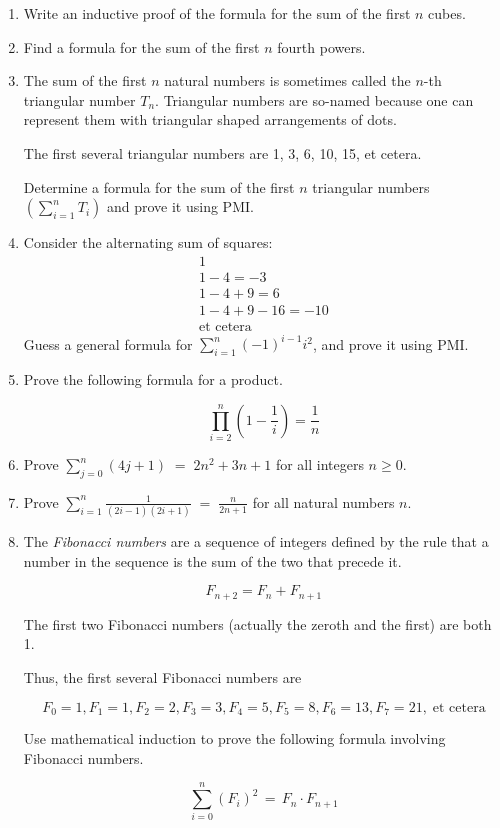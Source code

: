 \begin{enumerate}
\item Write an inductive proof of the formula for the sum 
of the first $n$ cubes.

\item Find a formula for the sum of the first $n$ fourth powers.

\item The sum of the first $n$ natural numbers is sometimes called
the $n$-th triangular number $T_n$.  Triangular numbers are so-named
because one can represent them with triangular shaped arrangements 
of dots. 

\begin{center}  \end{center}

The first several triangular numbers are 1, 3, 6, 10, 15, et cetera.

Determine a formula for the sum of the first $n$ triangular numbers $\displaystyle \left( \sum_{i=1}^n T_i \right)$ and prove it using PMI.

\item Consider the alternating sum of squares:
\begin{gather*}
1 \\
1 - 4 = -3 \\
1 - 4 + 9 = 6 \\
1 - 4 + 9 - 16 = -10 \\
\mbox{et cetera}
\end{gather*}
Guess a general formula for $\sum_{i=1}^n (-1)^{i-1} i^2$, and prove it using PMI.

\item Prove the following formula for a product.

\[ \prod_{i=2}^n \left(1 - \frac{1}{i}\right) =  \frac{1}{n} \]

\item Prove $\displaystyle \sum_{j=0}^{n}(4j+1) \; = \; 2n^{2}+3n+1$ for all
integers $n \geq 0$.

\item Prove $\displaystyle \sum_{i=1}^{n}\frac{1}{(2i-1)(2i+1)} \; = \; \frac{n}{2n+1}$ for all natural numbers $n$.

\item The  \emph{Fibonacci numbers} are a sequence of integers defined by
the rule that a number in the sequence is the sum of the two that 
precede it.

\[ F_{n+2} = F_n + F_{n+1}  \]

\noindent The first two Fibonacci numbers (actually the zeroth and the first) 
are both 1.  

\noindent Thus, the first several Fibonacci numbers are

\[ F_0 = 1, F_1=1, F_2=2, F_3=3, F_4=5, F_5=8, F_6=13, F_7=21, \; \mbox{et cetera} \]

Use mathematical induction to prove the following formula involving
Fibonacci numbers.

\[ \sum_{i=0}^n (F_i)^2 \, = \, F_n \cdot F_{n+1} \]

\end{enumerate}


